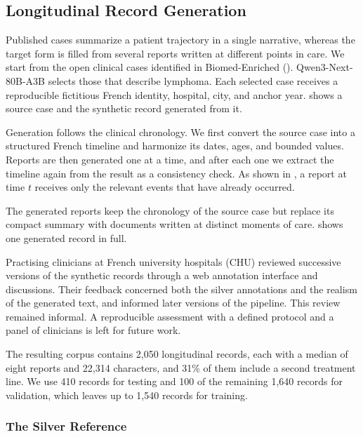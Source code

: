 \subsection{Longitudinal Record Generation}
\label{sec:lymphoma-dossiers}

Published cases summarize a patient trajectory in a single narrative, whereas
the target form is filled from several reports written at different points in
care. We start from the open clinical cases identified in Biomed-Enriched
(). Qwen3-Next-80B-A3B selects those that describe lymphoma.
Each selected case receives a reproducible fictitious French identity, hospital,
city, and anchor year.  shows a source case and the
synthetic record generated from it.



Generation follows the clinical chronology. We first convert the source case into
a structured French timeline and harmonize its dates, ages, and bounded values.
Reports are then generated one at a time, and after each one we extract the
timeline again from the result as a consistency check. As shown in
, a report at time $t$ receives only the relevant events
that have already occurred.



The generated reports keep the chronology of the source case but replace its
compact summary with documents written at distinct moments of care.
 shows one generated record in full.

Practising clinicians at French university hospitals (CHU) reviewed successive
versions of the synthetic records through a web annotation interface and
discussions. Their feedback concerned both the silver annotations and the realism
of the generated text, and informed later versions of the pipeline. This review
remained informal. A reproducible assessment with a defined protocol and a panel
of clinicians is left for future work.

The resulting corpus contains 2,050 longitudinal records, each with a median of
eight reports and 22,314 characters, and 31\% of them include a second treatment
line. We use 410 records for testing and 100 of the remaining 1,640 records for
validation, which leaves up to 1,540 records for training.


\subsubsection{The Silver Reference}
\label{sec:tapdl}

